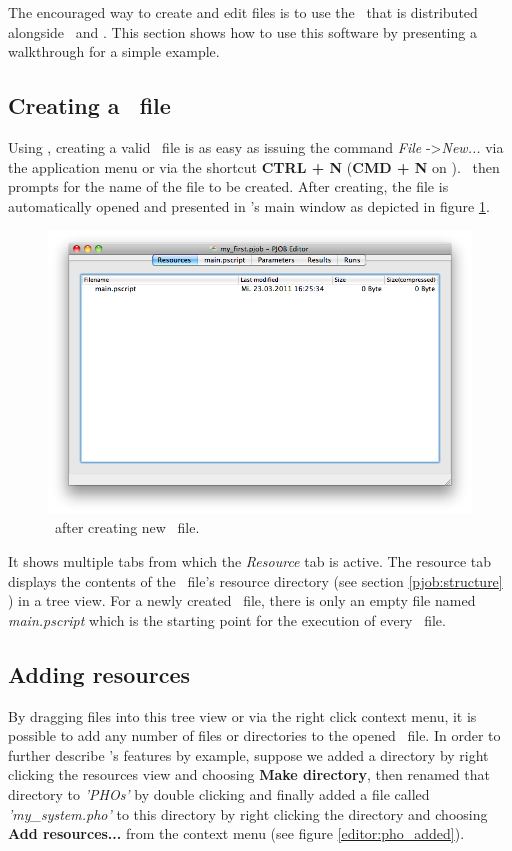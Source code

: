 The encouraged way to create and edit \PJOB{} files is to use the \pjobeditor\
that is distributed alongside \PHO\ and \PQUEUE.
This section shows how to use this software by presenting a walkthrough for a simple example.


\subsection{Creating a \PJOB\ file}
Using \pjobeditor, creating a valid \PJOB\ file is as easy as issuing the command \textit{File} -\textgreater \textit{New...}
via the application menu or via the shortcut \textbf{CTRL + N} (\textbf{CMD + N} on \mac).
\pjobeditor\ then prompts for the name of the file to be created.
After creating, the file is automatically opened and presented in \pjobeditor's main window
as depicted in figure \ref{editor:new_job_created}.

\begin{figure}[h!]
\includegraphics[width=\textwidth]{Screenshots/PJobEditor/new_job_created.png}
\caption{\pjobeditor\ after creating new \PJOB\ file.}
\label{editor:new_job_created}
\end{figure}

It shows multiple tabs from which the \textit{Resource} tab is active.
The resource tab displays the contents of the \PJOB\ file's resource directory
(see section \ref{pjob:structure} \nameref{pjob:structure}) in a tree view.
For a newly created \PJOB\ file, there is only an empty file named \textit{main.pscript}
which is the starting point for the execution of every \PJOB\ file.



\subsection{Adding resources}
By dragging files into this tree view or via the right click context menu,
it is possible to add any number of files or directories to the opened \PJOB\ file.
In order to further describe \pjobeditor's features by example,
suppose we added a directory by right clicking the resources view and choosing \textbf{Make directory},
then renamed that directory to \textit{'PHOs'} by double clicking
and finally added a file called \textit{'my\_system.pho'} to this directory by right clicking the directory
and choosing \textbf{Add resources...} from the context menu
(see figure \ref{editor:pho_added}).

